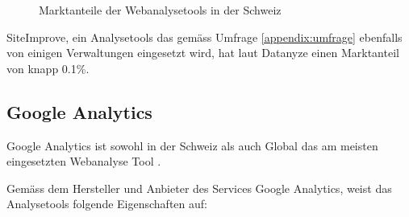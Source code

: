\begin{figure}[h]
  \centering
  \caption{Marktanteile der Webanalysetools in der Schweiz \parencite{datanyzeSwitzerlandWebanalytics}}
  \label{fig:marktanteil}
\end{figure}

SiteImprove, ein Analysetools das gemäss Umfrage \ref{appendix:umfrage} ebenfalls von einigen Verwaltungen eingesetzt wird, hat laut Datanyze \parencite{datanyzeSwitzerlandWebanalytics} einen Marktanteil von knapp 0.1\%.

\subsection{Google Analytics}\label{subsec:GoogleAnalytics}
Google Analytics ist sowohl in der Schweiz als auch Global das am meisten eingesetzten Webanalyse Tool \parencite{datanyzeSwitzerlandWebanalytics}. 

Gemäss dem Hersteller und Anbieter des Services Google Analytics, weist das Analysetools folgende Eigenschaften auf:

